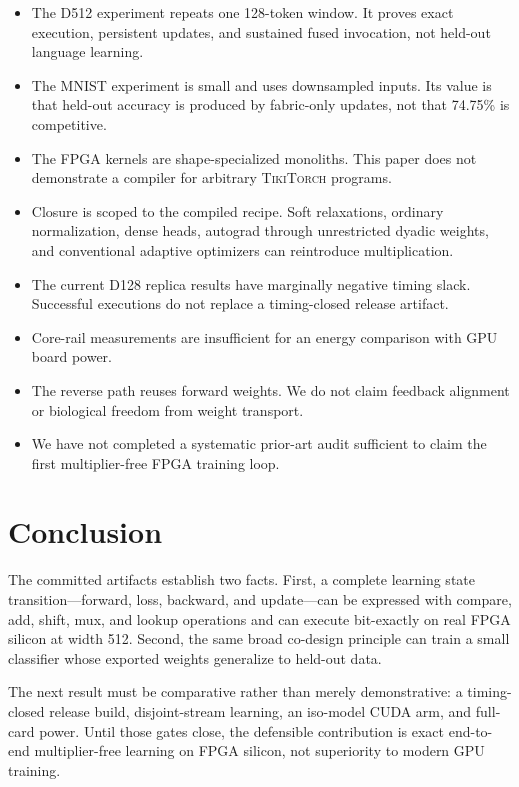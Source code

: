 \documentclass[10pt]{article}
\newcommand{\tikitorch}{\textsc{TikiTorch}}
\begin{document}
\begin{itemize}
  \item The D512 experiment repeats one 128-token window.  It proves exact
  execution, persistent updates, and sustained fused invocation, not held-out
  language learning.
  \item The MNIST experiment is small and uses downsampled inputs.  Its value is
  that held-out accuracy is produced by fabric-only updates, not that 74.75\%
  is competitive.
  \item The FPGA kernels are shape-specialized monoliths.  This paper does not
  demonstrate a compiler for arbitrary \tikitorch{} programs.
  \item Closure is scoped to the compiled recipe.  Soft relaxations, ordinary
  normalization, dense heads, autograd through unrestricted dyadic weights,
  and conventional adaptive optimizers can reintroduce multiplication.
  \item The current D128 replica results have marginally negative timing slack.
  Successful executions do not replace a timing-closed release artifact.
  \item Core-rail measurements are insufficient for an energy comparison with
  GPU board power.
  \item The reverse path reuses forward weights.  We do not claim feedback
  alignment or biological freedom from weight transport.
  \item We have not completed a systematic prior-art audit sufficient to claim
  the first multiplier-free FPGA training loop.
\end{itemize}

\section{Conclusion}

The committed artifacts establish two facts.  First, a complete learning state
transition---forward, loss, backward, and update---can be expressed with
compare, add, shift, mux, and lookup operations and can execute bit-exactly on
real FPGA silicon at width 512.  Second, the same broad co-design principle can
train a small classifier whose exported weights generalize to held-out data.

The next result must be comparative rather than merely demonstrative: a
timing-closed release build, disjoint-stream learning, an iso-model CUDA arm,
and full-card power.  Until those gates close, the defensible contribution is
exact end-to-end multiplier-free learning on FPGA silicon, not superiority to
modern GPU training.
\end{document}
